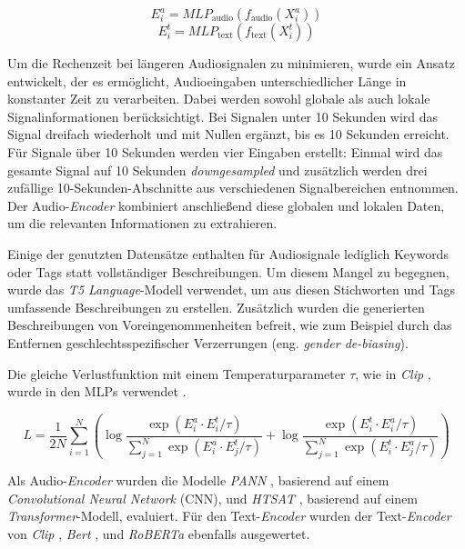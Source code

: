 \documentclass[
  a4paper,  %
  twoside,  %
  bibliography=totoc,
  headsepline,
  cleardoublepage=empty,
  parskip=half,
  draft=false
]{scrbook}
\begin{document}
\begin{equation}
     E_i^a = M L P_{\text{audio}}\left(f_{\text{audio}}\left(X_i^a\right)\right)
\end{equation}
\begin{equation}
    E_i^t = M L P_{\text{text}}\left(f_{\text{text}}\left(X_i^t\right)\right)
\end{equation}

Um die Rechenzeit bei längeren Audiosignalen zu minimieren, wurde ein Ansatz entwickelt, der es ermöglicht, Audioeingaben unterschiedlicher Länge in konstanter Zeit zu verarbeiten. Dabei werden sowohl globale als auch lokale Signalinformationen berücksichtigt. Bei Signalen unter 10 Sekunden wird das Signal dreifach wiederholt und mit Nullen ergänzt, bis es 10 Sekunden erreicht. Für Signale über 10 Sekunden werden vier Eingaben erstellt: Einmal wird das gesamte Signal auf 10 Sekunden \emph{downgesampled} und zusätzlich werden drei zufällige 10-Sekunden-Abschnitte aus verschiedenen Signalbereichen entnommen. Der Audio-\emph{Encoder} kombiniert anschließend diese globalen und lokalen Daten, um die relevanten Informationen zu extrahieren. \cite{wu_large-scale_2023}

Einige der genutzten Datensätze enthalten für Audiosignale lediglich Keywords oder Tags statt vollständiger Beschreibungen. Um diesem Mangel zu begegnen, wurde das \emph{T5} \cite{raffel_exploring_2020} \emph{Language}-Modell verwendet, um aus diesen Stichworten und Tags umfassende Beschreibungen zu erstellen. Zusätzlich wurden die generierten Beschreibungen von Voreingenommenheiten befreit, wie zum Beispiel durch das Entfernen geschlechtsspezifischer Verzerrungen (eng. \emph{gender de-biasing}). \cite{wu_large-scale_2023}

Die gleiche Verlustfunktion mit einem Temperaturparameter $\tau$, wie in \emph{Clip} \cite{radford_learning_2021}, wurde in den MLPs verwendet \cite{wu_large-scale_2023}.

\begin{equation}
L=\frac{1}{2 N} \sum_{i=1}^N\left(\log \frac{\exp \left(E_i^a \cdot E_i^t / \tau\right)}{\sum_{j=1}^N \exp \left(E_i^a \cdot E_j^t / \tau\right)}+\log \frac{\exp \left(E_i^t \cdot E_i^a / \tau\right)}{\sum_{j=1}^N \exp \left(E_i^t \cdot E_j^a / \tau\right)}\right)
\end{equation}

Als Audio-\emph{Encoder} wurden die Modelle \emph{PANN} \cite{kong_panns_2020}, basierend auf einem \emph{Convolutional Neural Network} (CNN), und \emph{HTSAT} \cite{chen_hts-at_2022}, basierend auf einem \emph{Transformer}-Modell, evaluiert. Für den Text-\emph{Encoder} wurden der Text-\emph{Encoder} von \emph{Clip} \cite{radford_learning_2021}, \emph{Bert} \cite{devlin_bert_2019}, und \emph{RoBERTa} \cite{liu_roberta_2019} ebenfalls ausgewertet. \cite{wu_large-scale_2023}
\end{document}
